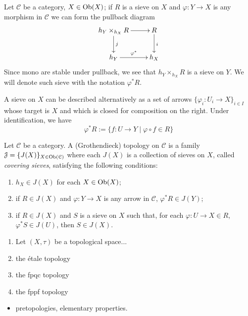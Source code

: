 \begin{refsection}
\begin{notation}
Let $\mathcal C$ be a category, $X \in \operatorname{Ob}(X)$; if $R$ is a sieve on $X$ and $\varphi \colon Y \to X$ is any morphism in $\mathcal C$ we can form the pullback diagram
\[
\xymatrix{
h_Y \times_{h_X} R \ar[d]^{j} \ar[r] & R \ar[d]^i \\ h_Y \ar[r]^{\varphi^*} & h_X
}
\]
Since mono are stable under pullback, we see that $h_Y \times_{h_X} R$ is a sieve on $Y$. We will denote such sieve with the notation $\varphi^* R$.
\end{notation}

\begin{rmk}
A sieve on $X$ can be described alternatively as a set of arrows $\{\varphi_i \colon U_i \to X \}_{i \in I}$ whose target is $X$ and which is closed for composition on the right. Under identification, we have
\[
\varphi^* R := \{f \colon U \to Y \mid \varphi \circ f \in R\}
\]
\end{rmk}

\begin{defin}
Let $\mathcal C$ be a category. A (Grothendieck) topology on $\mathcal C$ is a family $\mathcal J = \{J(X)\}_{X \in \operatorname{Ob}(\mathcal C)}$ where each $J(X)$ is a collection of sieves on $X$, called \emph{covering sieves}, satisfying the following conditions:
\begin{enumerate}
\item $h_X \in J(X)$ for each $X \in \operatorname{Ob}(X)$;
\item if $R \in J(X)$ and $\varphi \colon Y \to X$ is any arrow in $\mathcal C$, $\varphi^* R \in J(Y)$;
\item if $R \in J(X)$ and $S$ is a sieve on $X$ such that, for each $\varphi \colon U \to X \in R$, $\varphi^* S \in J(U)$, then $S \in J(X)$.
\end{enumerate}
\end{defin}

\begin{eg}
\begin{enumerate}
\item Let $(X,\tau)$ be a topological space...
\item the étale topology
\item the fpqc topology
\item the fppf topology
\end{enumerate}
\end{eg}

\begin{itemize}
\item pretopologies, elementary properties.
\end{itemize}


\end{refsection}
